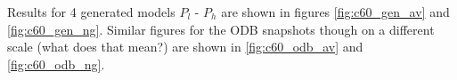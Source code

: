 Results for 4 generated models $P_l$ - $P_h$ are shown in figures \ref{fig:c60_gen_av} and \ref{fig:c60_gen_ng}. Similar figures for the ODB snapshots though on a different scale (what does that mean?) are shown in \ref{fig:c60_odb_av} and \ref{fig:c60_odb_ng}.

\begin{figure}[h]
\begin{center}
\end{center}
\end{figure}
